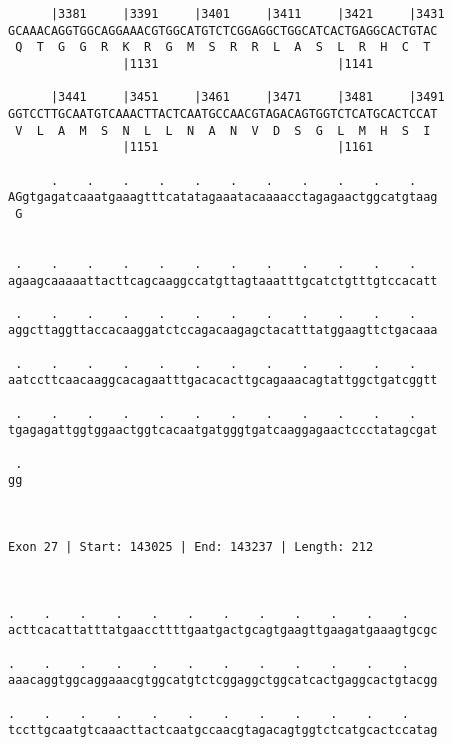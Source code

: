 \documentclass{article}
\begin{document}
\begin{Verbatim}
      |3381     |3391     |3401     |3411     |3421     |3431
GCAAACAGGTGGCAGGAAACGTGGCATGTCTCGGAGGCTGGCATCACTGAGGCACTGTAC
 Q  T  G  G  R  K  R  G  M  S  R  R  L  A  S  L  R  H  C  T 
                |1131                         |1141         
  
      |3441     |3451     |3461     |3471     |3481     |3491
GGTCCTTGCAATGTCAAACTTACTCAATGCCAACGTAGACAGTGGTCTCATGCACTCCAT
 V  L  A  M  S  N  L  L  N  A  N  V  D  S  G  L  M  H  S  I 
                |1151                         |1161         
  
      .    .    .    .    .    .    .    .    .    .    .   
AGgtgagatcaaatgaaagtttcatatagaaatacaaaacctagagaactggcatgtaag
 G                                                          
                                                            
  
 .    .    .    .    .    .    .    .    .    .    .    .   
agaagcaaaaattacttcagcaaggccatgttagtaaatttgcatctgtttgtccacatt
                                                            
 .    .    .    .    .    .    .    .    .    .    .    .   
aggcttaggttaccacaaggatctccagacaagagctacatttatggaagttctgacaaa
                                                            
 .    .    .    .    .    .    .    .    .    .    .    .   
aatccttcaacaaggcacagaatttgacacacttgcagaaacagtattggctgatcggtt
                                                            
 .    .    .    .    .    .    .    .    .    .    .    .   
tgagagattggtggaactggtcacaatgatgggtgatcaaggagaactccctatagcgat
                                                            
 .
gg
  
  
 
Exon 27 | Start: 143025 | End: 143237 | Length: 212



.    .    .    .    .    .    .    .    .    .    .    .    
acttcacattatttatgaaccttttgaatgactgcagtgaagttgaagatgaaagtgcgc
                                                            
.    .    .    .    .    .    .    .    .    .    .    .    
aaacaggtggcaggaaacgtggcatgtctcggaggctggcatcactgaggcactgtacgg
                                                            
.    .    .    .    .    .    .    .    .    .    .    .    
tccttgcaatgtcaaacttactcaatgccaacgtagacagtggtctcatgcactccatag
                                                            

\end{Verbatim}
\end{document}
